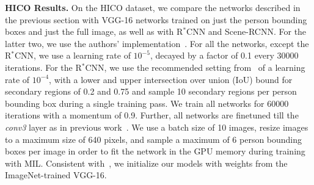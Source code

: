 \documentclass[runningheads]{llncs}
\begin{document}
\begin{comment}
		\end{tabular}
	\end{center}
	\caption{Performance of various networks on the HICO person-activity dataset. Our networks which fuse features from both person bounding box and the full image, outperform other architectures. Note that usage of the Bounding Box (Bbox) necessitates the usage of Multiple Instance Learning (MIL).}
	\label{table:hico_results}
\end{table}
\end{comment}{\bf HICO Results.} On the HICO dataset, we compare the networks described in the previous section with VGG-16 networks trained on just the person bounding boxes and just the full image, as well as with R$^\ast$CNN and Scene-RCNN. For the latter two, we use the authors' implementation~\cite{gkioxari2015rstarcnn}. For all the networks, except the R$^\ast$CNN, we use a learning rate of $10^{-5}$, decayed by a factor of 0.1 every 30000 iterations. For the R$^\ast$CNN, we use the recommended setting from~\cite{gkioxari2015rstarcnn} of a learning rate of $10^{-4}$, with a lower and upper intersection over union (IoU) bound for secondary regions of 0.2 and 0.75 and sample 10 secondary regions per person bounding box during a single training pass. We train all networks for 60000 iterations with a momentum of 0.9. Further, all networks are finetuned till the \emph{conv3} layer as in previous work~\cite{gkioxari2015rstarcnn,girshick2015fast}. We use a batch size of 10 images, resize images to a maximum size of 640 pixels, and sample a maximum of 6 person bounding boxes per image in order to fit the network in the GPU memory during training with MIL. Consistent with~\cite{girshick2014rich,agrawal2014analyzing,bell2015InsideOutside}, we initialize our models with weights from the ImageNet-trained VGG-16. 
\end{document}
